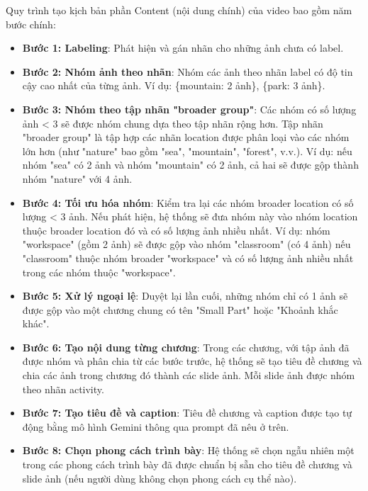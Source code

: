 Quy trình tạo kịch bản phần Content (nội dung chính) của video bao gồm năm bước chính:

\begin{itemize}
    \item \textbf{Bước 1: Labeling}: Phát hiện và gán nhãn cho những ảnh chưa có label.
    
    \item \textbf{Bước 2: Nhóm ảnh theo nhãn}: Nhóm các ảnh theo nhãn label có độ tin cậy cao nhất của từng ảnh. Ví dụ: \{mountain: 2 ảnh\}, \{park: 3 ảnh\}.
    
    \item \textbf{Bước 3: Nhóm theo tập nhãn "broader group"}: Các nhóm có số lượng ảnh < 3 sẽ được nhóm chung dựa theo tập nhãn rộng hơn. Tập nhãn "broader group" là tập hợp các nhãn location được phân loại vào các nhóm lớn hơn (như "nature" bao gồm "sea", "mountain", "forest", v.v.). Ví dụ: nếu nhóm "sea" có 2 ảnh và nhóm "mountain" có 2 ảnh, cả hai sẽ được gộp thành nhóm "nature" với 4 ảnh.
    
    \item \textbf{Bước 4: Tối ưu hóa nhóm}: Kiểm tra lại các nhóm broader location có số lượng < 3 ảnh. Nếu phát hiện, hệ thống sẽ đưa nhóm này vào nhóm location thuộc broader location đó và có số lượng ảnh nhiều nhất. Ví dụ: nhóm "workspace" (gồm 2 ảnh) sẽ được gộp vào nhóm "classroom" (có 4 ảnh) nếu "classroom" thuộc nhóm broader "workspace" và có số lượng ảnh nhiều nhất trong các nhóm thuộc "workspace".
    
    \item \textbf{Bước 5: Xử lý ngoại lệ}: Duyệt lại lần cuối, những nhóm chỉ có 1 ảnh sẽ được gộp vào một chương chung có tên "Small Part" hoặc "Khoảnh khắc khác".
    \item \textbf{Bước 6: Tạo nội dung từng chương}: Trong các chương, với tập ảnh đã được nhóm và phân chia từ các bước trước, hệ thống sẽ tạo tiêu đề chương và chia các ảnh trong chương đó thành các slide ảnh. Mỗi slide ảnh được nhóm theo nhãn activity. 
    \item \textbf{Bước 7: Tạo tiêu đề và caption}: Tiêu đề chương và caption được tạo tự động bằng mô hình Gemini thông qua prompt đã nêu ở trên. 
    \item \textbf{Bước 8: Chọn phong cách trình bày}: Hệ thống sẽ chọn ngẫu nhiên một trong các phong cách trình bày đã được chuẩn bị sẵn cho tiêu đề chương và slide ảnh (nếu người dùng không chọn phong cách cụ thể nào).
\end{itemize}

